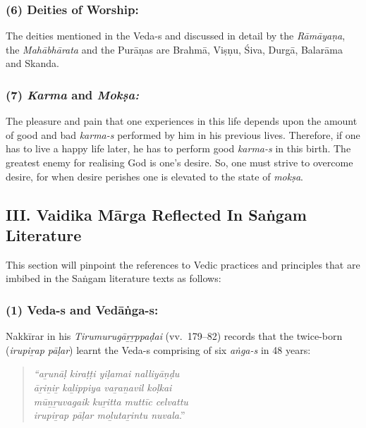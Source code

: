 \subsubsection*{(6) Deities of Worship:}

\vskip -8pt

The deities mentioned in the Veda-s and discussed in detail by the \textit{Rāmāyaṇa}, the \textit{Mahābhārata} and the Purāṇas are Brahmā, Viṣṇu, Śiva, Durgā, Balarāma and Skanda.


\subsubsection*{(7) \textit{Karma} and \textit{Mokṣa:}}

\vskip -8pt

The pleasure and pain that one experiences in this life depends upon the amount of good and bad \textit{karma-s} performed by him in his previous lives. Therefore, if one has to live a happy life later, he has to perform good \textit{karma-s} in this birth. The greatest enemy for realising God is one’s desire. So, one must strive to overcome desire, for when desire perishes one is elevated to the state of \textit{mokṣa}.


\subsection*{III. Vaidika Mārga Reflected In Saṅgam Literature}

\vskip -8pt

This section will pinpoint the references to Vedic practices and principles that are imbibed in the Saṅgam literature texts as follows:

\subsubsection*{(1) Veda-s and Vedāṅga-s:}

\vskip -12pt

Nakkīrar in his \textit{Tirumurugāṟṟppaḍai} (vv.~179–82) records that the twice-born (\textit{irupiṟap pāḷar}) learnt the Veda-s comprising of six \textit{aṅga-s} in 48 years:

\vskip -11pt

\begin{quote}
\textit{“aṟunāḷ kiraṭṭi yiḷamai nalliyāṇḍu}\\\textit{āṟiṉiṟ kaḻippiya vaṟaṉavil koḷkai}\\\textit{mūṉṟuvagaik kuṟitta muttīc celvattu}\\\textit{irupiṟap pāḷar moḻutaṟintu nuvala}.”
\end{quote}

